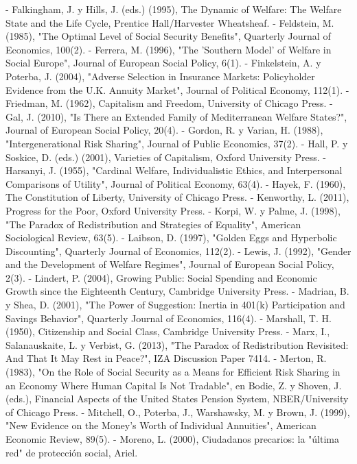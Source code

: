 \documentclass[10pt,a4paper]{article}
\begin{document}
- Falkingham, J. y Hills, J. (eds.) (1995), The Dynamic of Welfare: The Welfare State and the Life Cycle, Prentice Hall/Harvester Wheatsheaf.
- Feldstein, M. (1985), "The Optimal Level of Social Security Benefits", Quarterly Journal of Economics, 100(2).
- Ferrera, M. (1996), "The 'Southern Model' of Welfare in Social Europe", Journal of European Social Policy, 6(1).
- Finkelstein, A. y Poterba, J. (2004), "Adverse Selection in Insurance Markets: Policyholder Evidence from the U.K. Annuity Market", Journal of Political Economy, 112(1).
- Friedman, M. (1962), Capitalism and Freedom, University of Chicago Press.
- Gal, J. (2010), "Is There an Extended Family of Mediterranean Welfare States?", Journal of European Social Policy, 20(4).
- Gordon, R. y Varian, H. (1988), "Intergenerational Risk Sharing", Journal of Public Economics, 37(2).
- Hall, P. y Soskice, D. (eds.) (2001), Varieties of Capitalism, Oxford University Press.
- Harsanyi, J. (1955), "Cardinal Welfare, Individualistic Ethics, and Interpersonal Comparisons of Utility", Journal of Political Economy, 63(4).
- Hayek, F. (1960), The Constitution of Liberty, University of Chicago Press.
- Kenworthy, L. (2011), Progress for the Poor, Oxford University Press.
- Korpi, W. y Palme, J. (1998), "The Paradox of Redistribution and Strategies of Equality", American Sociological Review, 63(5).
- Laibson, D. (1997), "Golden Eggs and Hyperbolic Discounting", Quarterly Journal of Economics, 112(2).
- Lewis, J. (1992), "Gender and the Development of Welfare Regimes", Journal of European Social Policy, 2(3).
- Lindert, P. (2004), Growing Public: Social Spending and Economic Growth since the Eighteenth Century, Cambridge University Press.
- Madrian, B. y Shea, D. (2001), "The Power of Suggestion: Inertia in 401(k) Participation and Savings Behavior", Quarterly Journal of Economics, 116(4).
- Marshall, T. H. (1950), Citizenship and Social Class, Cambridge University Press.
- Marx, I., Salanauskaite, L. y Verbist, G. (2013), "The Paradox of Redistribution Revisited: And That It May Rest in Peace?", IZA Discussion Paper 7414.
- Merton, R. (1983), "On the Role of Social Security as a Means for Efficient Risk Sharing in an Economy Where Human Capital Is Not Tradable", en Bodie, Z. y Shoven, J. (eds.), Financial Aspects of the United States Pension System, NBER/University of Chicago Press.
- Mitchell, O., Poterba, J., Warshawsky, M. y Brown, J. (1999), "New Evidence on the Money's Worth of Individual Annuities", American Economic Review, 89(5).
- Moreno, L. (2000), Ciudadanos precarios: la "última red" de protección social, Ariel.
\end{document}
